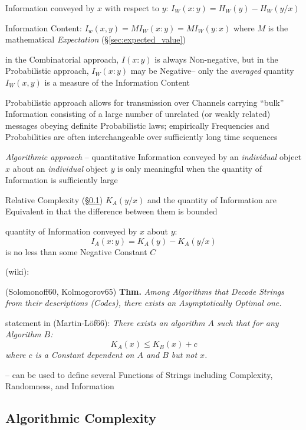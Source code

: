 Information conveyed by $x$ with respect to $y$: $I_W(x:y) = H_W(y) - H_W(y/x)$

Information Content: $I_w(x,y) = MI_W(x : y) = MI_W(y : x)$ where $M$ is the
mathematical \emph{Expectation} (\S\ref{sec:expected_value})

in the Combinatorial approach, $I(x:y)$ is always Non-negative, but in the
Probabilistic approach, $I_W(x:y)$ may be Negative-- only the \emph{averaged}
quantity $I_W(x,y)$ is a measure of the Information Content

Probabilistic approach allows for transmission over Channels carrying ``bulk''
Information consisting of a large number of unrelated (or weakly related)
messages obeying definite Probabilistic laws; empirically Frequencies and
Probabilities are often interchangeable over sufficiently long time sequences

\emph{Algorithmic approach} -- quantitative Information conveyed by an
\emph{individual} object $x$ about an \emph{individual} object $y$ is only
meaningful when the quantity of Information is sufficiently large

Relative Complexity (\S\ref{sec:algorithmic_complexity}) $K_A(y/x)$ and the
quantity of Information are Equivalent in that the difference between them is
bounded

quantity of Information conveyed by $x$ about $y$:
\[
  I_A(x:y) = K_A(y) - K_A(y/x)
\]
is no less than some Negative Constant $C$

(wiki):

(Solomonoff60, Kolmogorov65) \textbf{Thm.}
\emph{Among Algorithms that Decode Strings from their descriptions (Codes),
  there exists an Asymptotically Optimal one.}

statement in (Martin-L\"of66):
\emph{
  There exists an algorithm $A$ such that for any Algorithm $B$:
  \[
    K_A(x) \leq K_B(x) + c
  \]
  where $c$ is a Constant dependent on $A$ and $B$ but not $x$.
}

-- can be used to define several Functions of Strings including Complexity,
Randomness, and Information



\subsection{Algorithmic Complexity}\label{sec:algorithmic_complexity}


